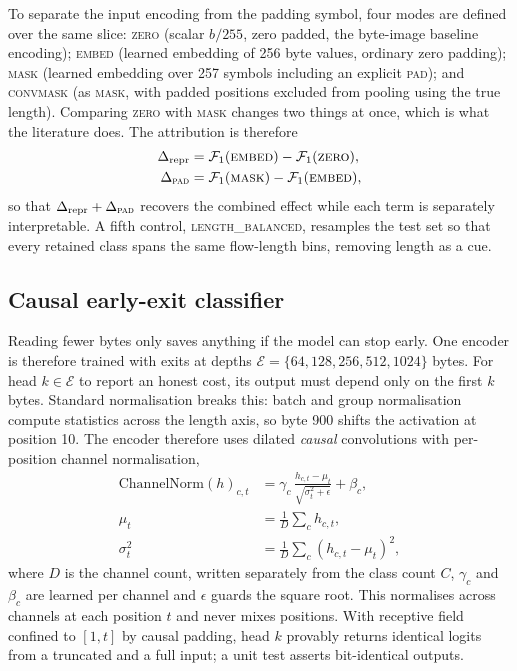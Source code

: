 \documentclass[pdflatex,sn-mathphys-num]{sn-jnl}
\theoremstyle{thmstyleone}%
\theoremstyle{thmstylethree}%
\begin{document}
To separate the input encoding from the padding symbol, four modes are defined
over the same slice:
\textsc{zero} (scalar $b/255$, zero padded, the byte-image baseline encoding);
\textsc{embed} (learned embedding of 256 byte values, ordinary zero padding);
\textsc{mask} (learned embedding over 257 symbols including an explicit
\textsc{pad}); and \textsc{convmask} (as \textsc{mask}, with padded positions
excluded from pooling using the true length). Comparing \textsc{zero} with
\textsc{mask} changes two things at once, which is what the literature does.
The attribution is therefore
\begin{align}
\Delta_{\text{repr}} &= \mathcal{F}_1(\textsc{embed}) - \mathcal{F}_1(\textsc{zero}),
\label{eq:drepr}\\
\Delta_{\textsc{pad}} &= \mathcal{F}_1(\textsc{mask}) - \mathcal{F}_1(\textsc{embed}),
\label{eq:dpad}
\end{align}
so that $\Delta_{\text{repr}} + \Delta_{\textsc{pad}}$ recovers the combined
effect while each term is separately interpretable. A fifth control,
\textsc{length\_balanced}, resamples the test set so that every retained class
spans the same flow-length bins, removing length as a cue.

\subsection{Causal early-exit classifier}

Reading fewer bytes only saves anything if the model can stop early. One
encoder is therefore trained with exits at depths
$\mathcal{E} = \{64, 128, 256, 512, 1024\}$ bytes. For head $k \in
\mathcal{E}$ to report an honest cost, its output must depend only on the first
$k$ bytes. Standard normalisation breaks this: batch and group normalisation
compute statistics across the length axis, so byte 900 shifts the activation at
position 10. The encoder therefore uses dilated \emph{causal} convolutions with
per-position channel normalisation,
\begin{equation}
\begin{aligned}
\mathrm{ChannelNorm}(h)_{c,t} &= \gamma_c \,
\frac{h_{c,t} - \mu_t}{\sqrt{\sigma_t^2 + \epsilon}} + \beta_c, \\
\mu_t &= \tfrac{1}{D}\textstyle\sum_{c} h_{c,t}, \\
\sigma_t^2 &= \tfrac{1}{D}\textstyle\sum_{c} (h_{c,t} - \mu_t)^2,
\end{aligned}
\label{eq:cnorm}
\end{equation}
where $D$ is the channel count, written separately from the class count $C$,
$\gamma_c$ and $\beta_c$ are learned per channel and $\epsilon$ guards the
square root. This normalises across channels
at each position $t$ and never mixes
positions. With receptive field confined to $[1,t]$ by causal padding, head $k$
provably returns identical logits from a truncated and a full input; a unit
test asserts bit-identical outputs.
\end{document}
